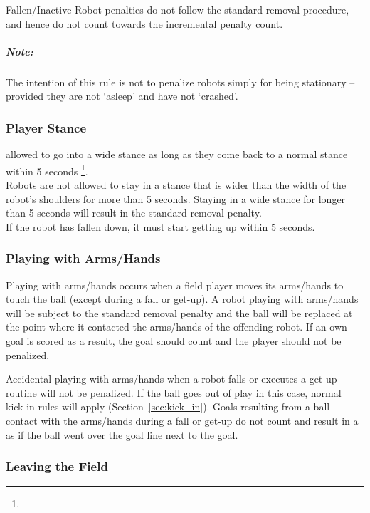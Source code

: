 Fallen/Inactive Robot penalties do not follow the standard removal procedure, and hence do not count towards the incremental penalty count.

\subparagraph{Note:} The intention of this rule is not to penalize robots simply for being stationary -- provided they are not `asleep' and have not `crashed'.

\subsubsection{Player Stance}
\label{sec:player_stance}
 allowed to go into a wide stance as long as they come back to a normal stance within 5 seconds \footnote{}. \\
Robots are not allowed to stay in a stance that is wider than the width of the robot's shoulders for more than 5 seconds. Staying in a wide stance for longer than 5 seconds will result in the standard removal penalty. \\
If the robot has fallen down, it must start getting up within 5 seconds. 

\subsubsection{Playing with Arms/Hands}
\label{sec:hand_ball}

Playing with arms/hands occurs when a field player moves its arms/hands to touch the ball (except during a fall or get-up). A robot playing with arms/hands will be subject to the standard removal penalty and the ball will be replaced at the point where it contacted the arms/hands of the offending robot. If an own goal is scored as a result, the goal should count and the player should not be penalized.

Accidental playing with arms/hands when a robot falls or executes a get-up routine will not be penalized. 
If the ball goes out of play in this case, normal kick-in rules will apply (\cf Section~\ref{sec:kick_in}). 
Goals resulting from a ball contact with the arms/hands during a fall or get-up do not count and result in a  as if the ball went over the goal line next to the goal.

\subsubsection{Leaving the Field}
\label{sec:leaving_field}

